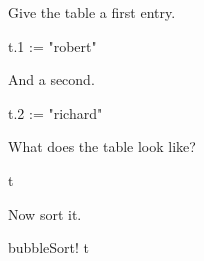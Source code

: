 \begin{xtc}
\begin{xtccomment}
Give the table a first entry.
\end{xtccomment}
\begin{spadsrc}
t.1 := "robert"
\end{spadsrc}
\begin{TeXOutput}
\begin{fricasmath}{11}
%
\end{fricasmath}
\end{TeXOutput}
\end{xtc}
\begin{xtc}
\begin{xtccomment}
And a second.
\end{xtccomment}
\begin{spadsrc}
t.2 := "richard"
\end{spadsrc}
\begin{TeXOutput}
\begin{fricasmath}{12}
%
\end{fricasmath}
\end{TeXOutput}
\end{xtc}
\begin{xtc}
\begin{xtccomment}
What does the table look like?
\end{xtccomment}
\begin{spadsrc}
t
\end{spadsrc}
\begin{TeXOutput}
\begin{fricasmath}{13}
%
\end{fricasmath}
\end{TeXOutput}
\end{xtc}
\begin{xtc}
\begin{xtccomment}
Now sort it.
\end{xtccomment}
\begin{spadsrc}
bubbleSort! t
\end{spadsrc}
\begin{TeXOutput}
\begin{fricasmath}{14}
%
\end{fricasmath}
\end{TeXOutput}
\end{xtc}

